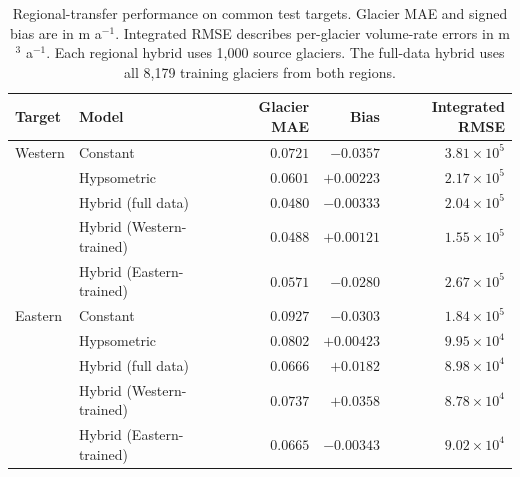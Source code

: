 \begin{table}[!htbp]
\centering\small
\setlength{\tabcolsep}{5pt}
\caption{Regional-transfer performance on common test targets. Glacier MAE and signed bias are in m a$^{-1}$. Integrated RMSE describes per-glacier volume-rate errors in m$^3$ a$^{-1}$. Each regional hybrid uses 1,000 source glaciers. The full-data hybrid uses all 8,179 training glaciers from both regions.}
\label{tab:transfer}
\begin{tabular}{llrrr}
\toprule
Target & Model & Glacier MAE & Bias & Integrated RMSE \\
\midrule
Western & Constant & $0.0721$ & $-0.0357$ & $3.81\times10^{5}$ \\
 & Hypsometric & $0.0601$ & $+0.00223$ & $2.17\times10^{5}$ \\
 & Hybrid (full data) & {\boldmath$0.0480$} & $-0.00333$ & $2.04\times10^{5}$ \\
 & Hybrid (Western-trained) & $0.0488$ & {\boldmath$+0.00121$} & {\boldmath$1.55\times10^{5}$} \\
 & Hybrid (Eastern-trained) & $0.0571$ & $-0.0280$ & $2.67\times10^{5}$ \\
\midrule
Eastern & Constant & $0.0927$ & $-0.0303$ & $1.84\times10^{5}$ \\
 & Hypsometric & $0.0802$ & $+0.00423$ & $9.95\times10^{4}$ \\
 & Hybrid (full data) & $0.0666$ & $+0.0182$ & $8.98\times10^{4}$ \\
 & Hybrid (Western-trained) & $0.0737$ & $+0.0358$ & {\boldmath$8.78\times10^{4}$} \\
 & Hybrid (Eastern-trained) & {\boldmath$0.0665$} & {\boldmath$-0.00343$} & $9.02\times10^{4}$ \\
\bottomrule
\end{tabular}
\end{table}

